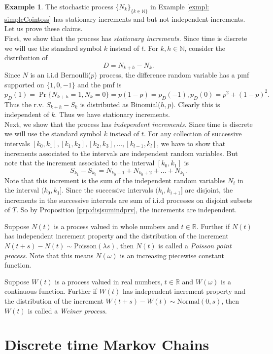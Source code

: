 \documentclass[letterpaper, 12pt]{article}
\newcommand{\1}{\mathds{1}} %
\theoremstyle{definition}
\newtheorem{example}[theorem]{Example}
\begin{document}
\begin{example}
  The stochastic process $\{N_k\}_{\{k \in \mathbb{N}\}}$ in Example \ref{exmpl: simpleCointoss} has stationary increments and but not independent increments. Let us prove these claims.\\
  First, we show that the process has \emph{stationary increments.} Since time is discrete we will use the standard symbol $k$ instead of $t$. For $k,h \in \mathbb{N}$, consider the distribution of $$D = N_{k+h} - N_k.$$ Since $N$ is an i.i.d Bernoulli($p$) process, the difference random variable has a pmf supported on $\{1,0,-1\}$ and the pmf is \[p_D(1) = \Pr\{N_{k+h}=1, N_k=0\}=p(1-p) = p_D(-1) , p_D(0) = p^2 + (1-p)^2. \] Thus the r.v. $S_{k+h} - S_k$ is distributed as Binomial($h,p$). Clearly this is independent of $k$. Thus we have stationary increments.\\
  Next, we show that the process has \emph{independent increments.} Since time is discrete we will use the standard symbol $k$ instead of $t$. For any collection of successive intervals $[k_0,k_1], [k_1,k_2], [k_2,k_3],\ldots, [k_{l-1},k_l]$, we have to show that increments associated to the intervals are independent random variables. But note that the increment associated to the interval $[k_0,k_1]$ is \[S_{k_1} - S_{k_0} = N_{k_0+1} + N_{k_0+2} + \ldots + N_{k_1}.\] Note that this increment is the sum of the independent random variables $N_i$ in the interval $(k_0,k_1]$. Since the successive intervals $(k_i,k_{i+1}]$ are disjoint, the increments in the successive intervals are sum of i.i.d processes on disjoint subsets of $T$. So by Proposition \ref{prp:disjsumindprv}, the increments are independent. 
\end{example}

Suppose $N(t)$ is a process valued in whole numbers and $t \in \mathbb{R}$. Further if $N(t)$ has independent increment property and the distribution of the increment $N(t+s)-N(t) \sim \text{Poisson}(\lambda s)$, then $N(t)$ is called a \emph{Poisson point process}. Note that this means $N(\omega)$ is an increasing piecewise constant function.

Suppose $W(t)$ is a process valued in real numbers, $t \in \mathbb{R}$ and $W(\omega)$ is a continuous function. Further if $W(t)$ has independent increment property and the distribution of the increment $W(t+s)-W(t) \sim \text{Normal}(0,s)$, then $W(t)$ is called a \emph{Weiner process}.

\newpage

\section{Discrete time Markov Chains}
\label{sec:DTMC}
\end{document}
